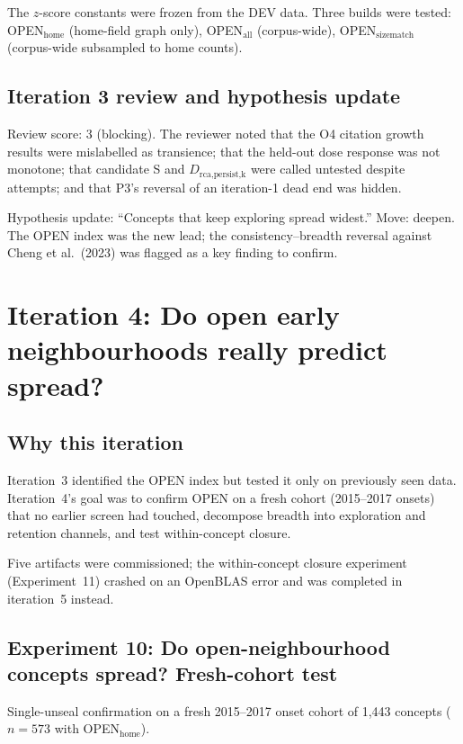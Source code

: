 \documentclass[11pt,letterpaper]{article}
\begin{document}
The $z$-score constants were frozen from the DEV data. Three builds were tested: OPEN$_{\text{home}}$ (home-field graph only), OPEN$_{\text{all}}$ (corpus-wide), OPEN$_{\text{sizematch}}$ (corpus-wide subsampled to home counts).

\subsection{Iteration 3 review and hypothesis update}

Review score: 3 (blocking). The reviewer noted that the O4 citation growth results were mislabelled as transience; that the held-out dose response was not monotone; that candidate S and $D_{\text{rca,persist,k}}$ were called untested despite attempts; and that P3's reversal of an iteration-1 dead end was hidden.

Hypothesis update: ``Concepts that keep exploring spread widest.'' Move: deepen. The OPEN index was the new lead; the consistency--breadth reversal against Cheng et al.\ (2023) was flagged as a key finding to confirm.

\section{Iteration 4: Do open early neighbourhoods really predict spread?}
\label{sec:iter4}

\subsection{Why this iteration}

Iteration~3 identified the OPEN index but tested it only on previously seen data. Iteration~4's goal was to confirm OPEN on a fresh cohort (2015--2017 onsets) that no earlier screen had touched, decompose breadth into exploration and retention channels, and test within-concept closure.

Five artifacts were commissioned; the within-concept closure experiment (Experiment~11) crashed on an OpenBLAS error and was completed in iteration~5 instead.

\subsection{Experiment 10: Do open-neighbourhood concepts spread? Fresh-cohort test}

Single-unseal confirmation on a fresh 2015--2017 onset cohort of 1{,}443 concepts ($n = 573$ with OPEN$_{\text{home}}$).
\end{document}
